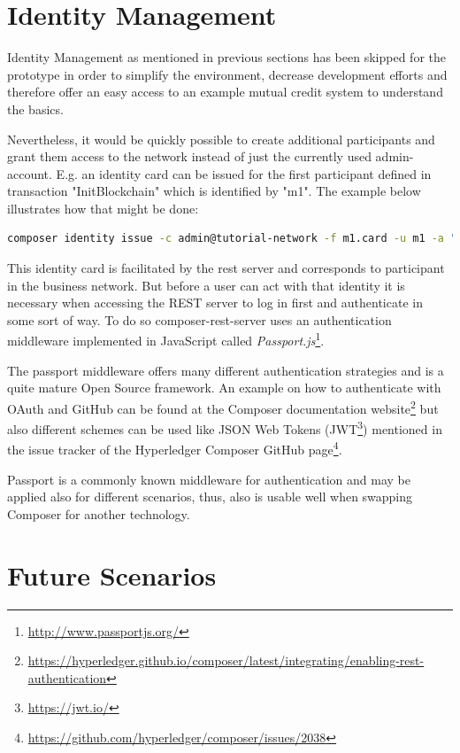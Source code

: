 \section{Identity Management}
\label{sec:id-management}

Identity Management as mentioned in previous sections has been skipped for the prototype in order to simplify the environment, decrease development efforts and therefore offer an easy access to an example mutual credit system to understand the basics.

Nevertheless, it would be quickly possible to create additional participants and grant them access to the network instead of just the currently used admin-account. E.g. an identity card can be issued for the first participant defined in transaction "InitBlockchain" which is identified by "m1". The example below illustrates how that might be done:

\begin{lstlisting}[language=bash]
	composer identity issue -c admin@tutorial-network -f m1.card -u m1 -a "resource:net.sardex.interlace.Individual#m1" -x true 
\end{lstlisting}

This identity card is facilitated by the rest server and corresponds to participant in the business network. But before a user can act with that identity it is necessary when accessing the REST server to log in first and authenticate in some sort of way. To do so composer-rest-server uses an authentication middleware implemented in JavaScript called \textit{Passport.js}\footnote{\url{http://www.passportjs.org/}}.

The passport middleware offers many different authentication strategies and is a quite mature Open Source framework. An example on how to authenticate with OAuth and GitHub can be found at the Composer documentation website\footnote{\url{https://hyperledger.github.io/composer/latest/integrating/enabling-rest-authentication}} but also different schemes can be used like JSON Web Tokens (JWT\footnote{\url{https://jwt.io/}}) mentioned in the issue tracker of the Hyperledger Composer GitHub page\footnote{\url{https://github.com/hyperledger/composer/issues/2038}}.

Passport is a commonly known middleware for authentication and may be applied also for different scenarios, thus, also is usable well when swapping Composer for another technology.

\section{Future Scenarios}
\label{sec:future-scene}

